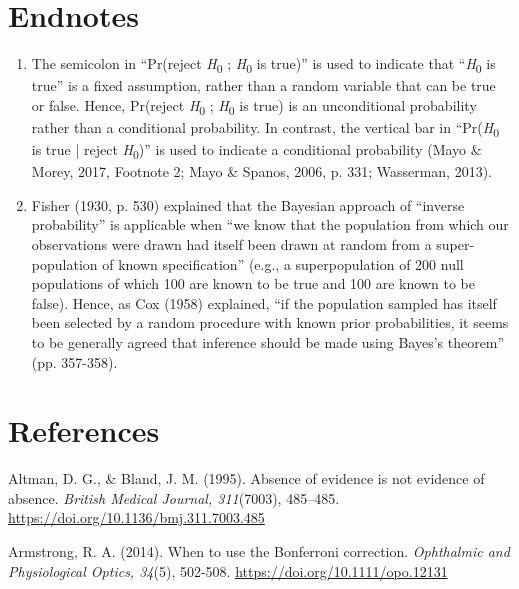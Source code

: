 \documentclass[authordate, meta]{jote-new-article}
\begin{document}
	\section{Endnotes}

	\begin{enumerate}


		\item The semicolon in “Pr(reject \emph{H}\textsubscript{0} ; \emph{H}\textsubscript{0} is true)” is used to indicate that “\emph{H}\textsubscript{0} is true” is a fixed assumption, rather than a random variable that can be true or false. Hence, Pr(reject \emph{H}\textsubscript{0} ; \emph{H}\textsubscript{0} is true) is an unconditional probability rather than a conditional probability. In contrast, the vertical bar in “Pr(\emph{H}\textsubscript{0} is true | reject \emph{H}\textsubscript{0})” is used to indicate a conditional probability (Mayo \& Morey, 2017, Footnote 2; Mayo \& Spanos, 2006, p. 331; Wasserman, 2013).



		\item
		Fisher (1930, p. 530) explained that the Bayesian approach of “inverse probability” is applicable when “we know that the population from which our observations were drawn had itself been drawn at random from a super-population of known specification” (e.g., a superpopulation of 200 null populations of which 100 are known to be true and 100 are known to be false). Hence, as Cox (1958) explained, “if the population sampled has itself been selected by a random procedure with known prior probabilities, it seems to be generally agreed that inference should be made using Bayes's theorem” (pp. 357-358).


	\end{enumerate}





	\section{References}



	Altman, D. G., \& Bland, J. M. (1995). Absence of evidence is not evidence of absence. \emph{British Medical Journal, 311}(7003), 485--485. \url{https://doi.org/10.1136/bmj.311.7003.485}



	Armstrong, R. A. (2014). When to use the Bonferroni correction. \emph{Ophthalmic and Physiological Optics, 34}(5), 502-508. \url{https://doi.org/10.1111/opo.12131}
\end{document}
